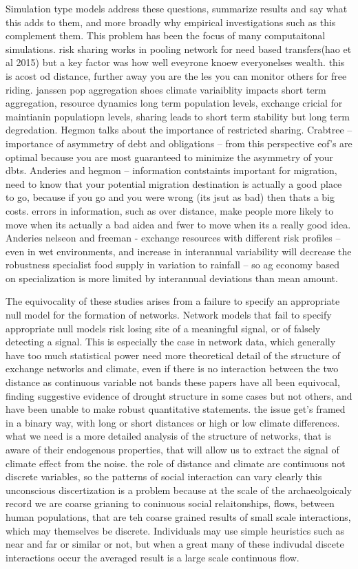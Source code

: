 \documentclass[fleqn,10pt]{wlscirep}
\begin{document}
Simulation type models address these questions, summarize results and say what this adds to them, and more broadly why empirical investigations such as this complement them. This problem has been the focus of many computaitonal simulations. risk sharing works in pooling network for need based transfers(hao et al 2015) but a key factor was how well eveyrone knoew everyonelses wealth. this is acost od distance, further away you are the les you can monitor others for free riding. janssen pop aggregation shoes climate variaiblity impacts short term aggregation, resource dynamics long term population levels, exchange cricial for maintianin populatiopn levels, sharing leads to short term stability but long term degredation. Hegmon talks about the importance of restricted sharing. Crabtree -- importance of asymmetry of debt and obligations -- from this perspective eof's are optimal because you are most guaranteed to minimize the asymmetry of your dbts. Anderies and hegmon -- information contstaints important for migration, need to know that your potential migration destination is actually a good place to go, because if you go and you were wrong (its jsut as bad) then thats a big costs. errors in information, such as over distance, make people more likely to move when its actually a bad aidea and fwer to move when its a really good idea. Anderies nelseon and freeman - exchange resources with different risk profiles -- even in wet environments, and increase in interannual variability will decrease the robustness specialist food supply in variation to rainfall -- so ag economy based on specialization is more limited by interannual deviations than mean amount.
 
 
 The equivocality of these studies arises from a failure to specify an appropriate null model for the formation of networks. Network models that fail to specify appropriate null models risk losing site of a meaningful signal, or of falsely detecting a signal. This is especially the case in network data, which generally have too much statistical power
 need more theoretical detail of the structure of exchange networks and climate, even if there is no interaction between the two
 distance as continuous variable not bands
 these papers have all been equivocal, finding suggestive evidence of drought structure in some cases but not others, and have been unable to make robust quantitative statements. the issue get's framed in a binary way, with long or short distances or high or low climate differences. what we need is a more detailed analysis of the structure of networks, that is aware of their endogenous properties, that will allow us to extract the signal of climate effect from the noise. the role of distance and climate are continuous not discrete variables, so the patterns of social interaction can vary clearly
 this unconscious discertization is a problem because at the scale of the archaeolgoicaly record we are coarse grianing to coninuous social relaitonships, flows, between human populations, that are teh coarse grained results of small scale interactions, which may themselves be discrete. Individuals may use simple heuristics such as near and far or similar or not, but when a great many of these indivudal discete interactions occur the averaged result is a large scale continuous flow.
\end{document}
